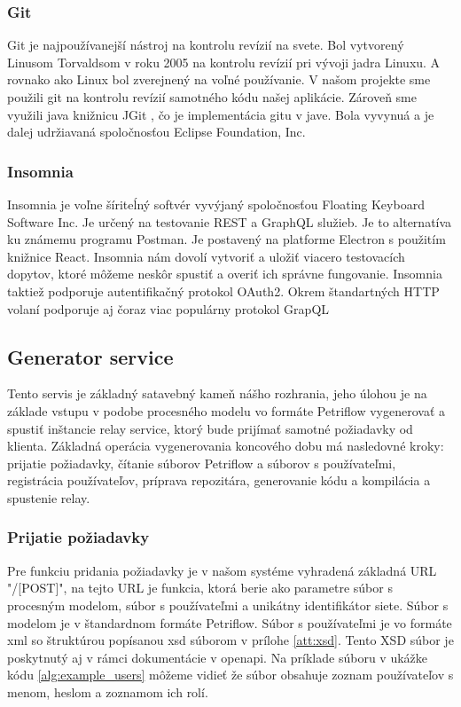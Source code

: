 \subsubsection{Git}
Git je najpoužívanejší nástroj na kontrolu revízií na svete. Bol vytvorený Linusom Torvaldsom v roku 2005 na kontrolu revízií pri vývoji jadra Linuxu. A rovnako ako Linux bol zverejnený na voľné používanie. V našom projekte sme použili git na kontrolu revízií samotného kódu našej aplikácie. Zároveň sme využili java knižnicu JGit \cite{jgit}, čo je implementácia gitu v jave. Bola vyvynuá a je dalej udržiavaná spoločnosťou Eclipse Foundation, Inc.

\subsubsection{Insomnia}
Insomnia \cite{insomnia} je voľne šíriteĺný softvér vyvýjaný spoločnosťou Floating Keyboard Software Inc. Je určený na testovanie REST a GraphQL služieb. Je to alternatíva ku známemu programu Postman. Je postavený na platforme Electron s použitím knižnice React. Insomnia nám dovolí vytvoriť a uložiť viacero testovacích dopytov, ktoré môžeme neskôr spustiť a overiť ich správne fungovanie. Insomnia taktiež podporuje autentifikačný protokol OAuth2. Okrem štandartných HTTP volaní podporuje aj čoraz viac populárny protokol GrapQL


\subsection{Generator service}  
Tento servis je základný satavebný kameň nášho rozhrania, jeho úlohou je na základe vstupu v podobe procesného modelu vo formáte Petriflow vygenerovať a spustiť inštancie relay service, ktorý bude prijímať samotné požiadavky od klienta. Základná operácia vygenerovania koncového dobu má nasledovné kroky:  
prijatie požiadavky,  
čítanie súborov Petriflow a súborov s používateľmi,  
registrácia používateľov, 
príprava repozitára, 
generovanie kódu  
a kompilácia a spustenie relay. 



\subsubsection{Prijatie požiadavky} 
Pre funkciu pridania požiadavky je v našom systéme vyhradená základná URL "/[POST]", na tejto URL je funkcia, ktorá berie ako parametre súbor s procesným modelom, súbor s používateľmi a unikátny identifikátor siete. Súbor s modelom je v štandardnom formáte Petriflow. Súbor s používateľmi je vo formáte \acrshort{xml} so štruktúrou popísanou \acrshort{xsd} súborom v prílohe \ref{att:xsd}. Tento XSD súbor je poskytnutý aj v rámci dokumentácie v \acrshort{openapi}. Na príklade súboru v ukážke kódu \ref{alg:example_users} môžeme vidieť že súbor obsahuje zoznam používateľov s menom, heslom a zoznamom ich rolí. 



